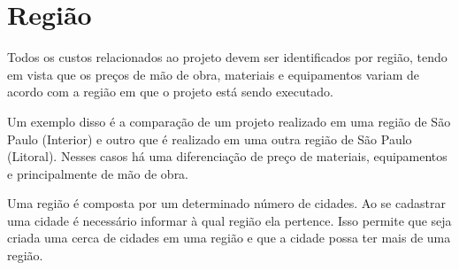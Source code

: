 \chapter{Região}

Todos os custos relacionados ao projeto devem ser identificados por região, tendo em vista que os preços de mão de obra, materiais e equipamentos variam de acordo com a região em que o projeto está sendo executado.

Um exemplo disso é a comparação de um projeto realizado em uma região de São Paulo (Interior) e outro que é realizado em uma outra região de São Paulo (Litoral). Nesses casos há uma diferenciação de preço de materiais, equipamentos e principalmente de mão de obra.

Uma região é composta por um determinado número de cidades. Ao se cadastrar uma cidade é necessário informar à qual região ela pertence. Isso permite que seja criada uma cerca de cidades em uma região e que a cidade possa ter mais de uma região.